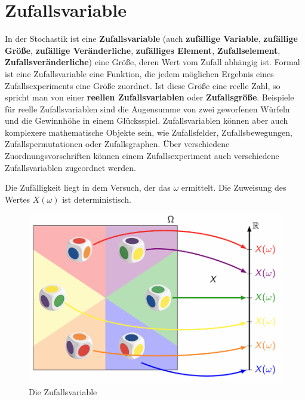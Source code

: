\documentclass[../Main.tex]{subfiles}
\begin{document}
\section{Zufallsvariable}
In der Stochastik ist eine \textbf{Zufallsvariable} (auch \textbf{zufällige Variable}, \textbf{zufällige Größe}, \textbf{zufällige Veränderliche}, \textbf{zufälliges Element}, \textbf{Zufallselement}, \textbf{Zufallsveränderliche}) eine Größe, deren Wert vom Zufall abhängig ist. Formal ist eine Zufallsvariable eine Funktion, die jedem möglichen Ergebnis eines Zufallsexperiments eine Größe zuordnet. Ist diese Größe eine reelle Zahl, so spricht man von einer \textbf{reellen Zufallsvariablen} oder \textbf{Zufallsgröße}. Beispiele für reelle Zufallsvariablen sind die Augensumme von zwei geworfenen Würfeln und die Gewinnhöhe in einem Glücksspiel. Zufallsvariablen können aber auch komplexere mathematische Objekte sein, wie Zufallsfelder, Zufallsbewegungen, Zufallspermutationen oder Zufallsgraphen. Über verschiedene Zuordnungsvorschriften können einem Zufallsexperiment auch verschiedene Zufallsvariablen zugeordnet werden.

Die Zufälligkeit liegt in dem Versuch, der das \(\omega\) ermittelt.
Die Zuweisung des Wertes \(X(\omega)\) ist deterministisch.

\begin{figure}[H]
    \centering
    \includegraphics[width=0.5\linewidth]{Images/zufallsvariable.png}
    \caption{Die Zufallsvariable}
\end{figure}
\end{document}
